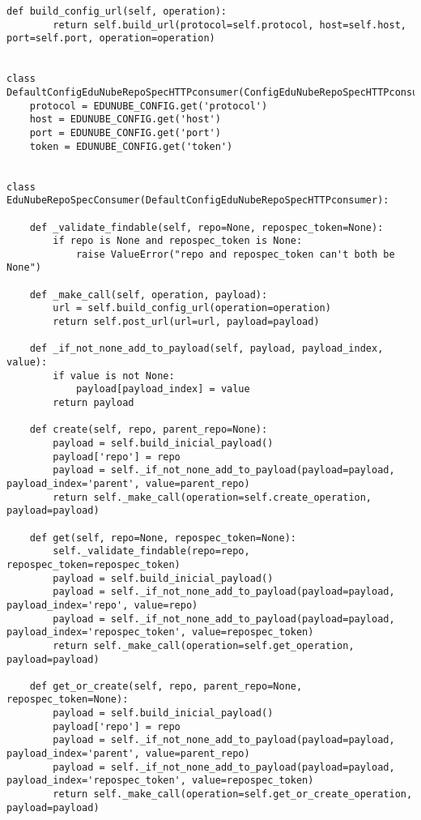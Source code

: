 \begin{lstlisting}[breaklines]
    def build_config_url(self, operation):
        return self.build_url(protocol=self.protocol, host=self.host, port=self.port, operation=operation)


class DefaultConfigEduNubeRepoSpecHTTPconsumer(ConfigEduNubeRepoSpecHTTPconsumer):
    protocol = EDUNUBE_CONFIG.get('protocol')
    host = EDUNUBE_CONFIG.get('host')
    port = EDUNUBE_CONFIG.get('port')
    token = EDUNUBE_CONFIG.get('token')


class EduNubeRepoSpecConsumer(DefaultConfigEduNubeRepoSpecHTTPconsumer):

    def _validate_findable(self, repo=None, repospec_token=None):
        if repo is None and repospec_token is None:
            raise ValueError("repo and repospec_token can't both be None")

    def _make_call(self, operation, payload):
        url = self.build_config_url(operation=operation)
        return self.post_url(url=url, payload=payload)

    def _if_not_none_add_to_payload(self, payload, payload_index, value):
        if value is not None:
            payload[payload_index] = value
        return payload

    def create(self, repo, parent_repo=None):
        payload = self.build_inicial_payload()
        payload['repo'] = repo
        payload = self._if_not_none_add_to_payload(payload=payload, payload_index='parent', value=parent_repo)
        return self._make_call(operation=self.create_operation, payload=payload)

    def get(self, repo=None, repospec_token=None):
        self._validate_findable(repo=repo, repospec_token=repospec_token)
        payload = self.build_inicial_payload()
        payload = self._if_not_none_add_to_payload(payload=payload, payload_index='repo', value=repo)
        payload = self._if_not_none_add_to_payload(payload=payload, payload_index='repospec_token', value=repospec_token)
        return self._make_call(operation=self.get_operation, payload=payload)

    def get_or_create(self, repo, parent_repo=None, repospec_token=None):
        payload = self.build_inicial_payload()
        payload['repo'] = repo
        payload = self._if_not_none_add_to_payload(payload=payload, payload_index='parent', value=parent_repo)
        payload = self._if_not_none_add_to_payload(payload=payload, payload_index='repospec_token', value=repospec_token)
        return self._make_call(operation=self.get_or_create_operation, payload=payload)


\end{lstlisting}
